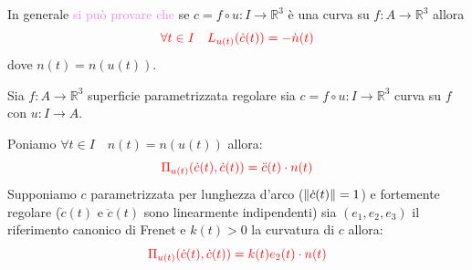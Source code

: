         \begin{osservazione}
        \mbox{}

        In generale \textcolor{violet}{si può provare che} se $c = f \circ u \colon I \to \mathbb{R}^3$ è una curva
        su $f \colon A \to \mathbb{R}^3$ allora 
        \begin{equation}
        \label{eq:operatore_di_Weingarten_differenziale_della_mappa_di_Gauss_2}
        \color{red} \forall t \in I \quad L_{u(t)}(\dot{c}(t)) = -\dot{n}(t) 
        \end{equation}
        dove $n(t) = n(u(t))$.
        \end{osservazione}
        \newpage
        \begin{proposizione}
        \mbox{}

        Sia $f \colon A \to \mathbb{R}^3$ superficie parametrizzata regolare sia $c = f \circ u \colon I \to \mathbb{R}^3$
        curva su $f$ con $u \colon I \to A$.

        Poniamo $\forall t \in I \quad n(t)=n(u(t))$ allora:
        \begin{equation}
        \label{eq:seconda_forma_fondamentale_curve_su_superficie_1}
        \color{red} \Pi_{u(t)} (\dot{c}(t), \dot{c}(t)) = \ddot{c}(t) \cdot n(t)
        \end{equation}
        Supponiamo $c$ parametrizzata per lunghezza d'arco \textcolor{blu}{($\lVert\dot{c}(t)\rVert=1$)} e fortemente regolare
        \textcolor{blu}{($\dot{c}(t)$ e $\ddot{c}(t)$ sono linearmente indipendenti)}
        sia $(e_1, e_2, e_3)$ il riferimento canonico di Frenet e $k(t)>0$ la curvatura di $c$ allora:
        \begin{equation}
        \label{eq:seconda_forma_fondamentale_curve_su_superficie_2}
        \color{red} \Pi_{u(t)} (\dot{c}(t), \dot{c}(t)) = k(t) e_2(t) \cdot n(t)
        \end{equation}
        \end{proposizione}
